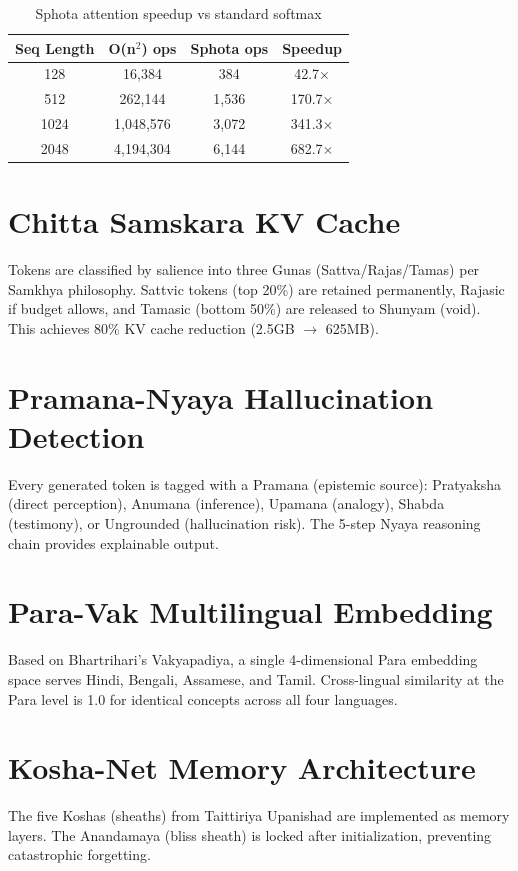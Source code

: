 \documentclass[12pt,a4paper]{article}
\begin{document}
\begin{table}[h]
\centering
\begin{tabular}{cccc}
\toprule
Seq Length & O(n$^2$) ops & Sphota ops & Speedup \\
\midrule
128 & 16,384 & 384 & 42.7$\times$ \\
512 & 262,144 & 1,536 & 170.7$\times$ \\
1024 & 1,048,576 & 3,072 & 341.3$\times$ \\
2048 & 4,194,304 & 6,144 & 682.7$\times$ \\
\bottomrule
\end{tabular}
\caption{Sphota attention speedup vs standard softmax}
\end{table}

\section{Chitta Samskara KV Cache}
Tokens are classified by salience into three Gunas (Sattva/Rajas/Tamas) per Samkhya philosophy. Sattvic tokens (top 20\%) are retained permanently, Rajasic if budget allows, and Tamasic (bottom 50\%) are released to Shunyam (void). This achieves 80\% KV cache reduction (2.5GB $\rightarrow$ 625MB).

\section{Pramana-Nyaya Hallucination Detection}
Every generated token is tagged with a Pramana (epistemic source): Pratyaksha (direct perception), Anumana (inference), Upamana (analogy), Shabda (testimony), or Ungrounded (hallucination risk). The 5-step Nyaya reasoning chain provides explainable output.

\section{Para-Vak Multilingual Embedding}
Based on Bhartrihari's Vakyapadiya, a single 4-dimensional Para embedding space serves Hindi, Bengali, Assamese, and Tamil. Cross-lingual similarity at the Para level is 1.0 for identical concepts across all four languages.

\section{Kosha-Net Memory Architecture}
The five Koshas (sheaths) from Taittiriya Upanishad are implemented as memory layers. The Anandamaya (bliss sheath) is locked after initialization, preventing catastrophic forgetting.
\end{document}

